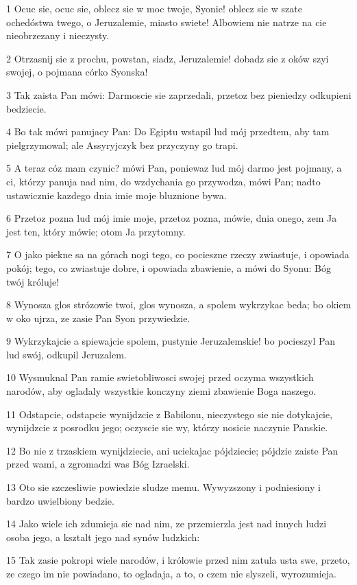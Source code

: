 \par 1 Ocuc sie, ocuc sie, oblecz sie w moc twoje, Syonie! oblecz sie w szate ochedóstwa twego, o Jeruzalemie, miasto swiete! Albowiem nie natrze na cie nieobrzezany i nieczysty.
\par 2 Otrzasnij sie z prochu, powstan, siadz, Jeruzalemie! dobadz sie z oków szyi swojej, o pojmana córko Syonska!
\par 3 Tak zaista Pan mówi: Darmoscie sie zaprzedali, przetoz bez pieniedzy odkupieni bedziecie.
\par 4 Bo tak mówi panujacy Pan: Do Egiptu wstapil lud mój przedtem, aby tam pielgrzymowal; ale Assyryjczyk bez przyczyny go trapi.
\par 5 A teraz cóz mam czynic? mówi Pan, poniewaz lud mój darmo jest pojmany, a ci, którzy panuja nad nim, do wzdychania go przywodza, mówi Pan; nadto ustawicznie kazdego dnia imie moje bluznione bywa.
\par 6 Przetoz pozna lud mój imie moje, przetoz pozna, mówie, dnia onego, zem Ja jest ten, który mówie; otom Ja przytomny.
\par 7 O jako piekne sa na górach nogi tego, co pocieszne rzeczy zwiastuje, i opowiada pokój; tego, co zwiastuje dobre, i opowiada zbawienie, a mówi do Syonu: Bóg twój króluje!
\par 8 Wynosza glos strózowie twoi, glos wynosza, a spolem wykrzykac beda; bo okiem w oko ujrza, ze zasie Pan Syon przywiedzie.
\par 9 Wykrzykajcie a spiewajcie spolem, pustynie Jeruzalemskie! bo pocieszyl Pan lud swój, odkupil Jeruzalem.
\par 10 Wysmuknal Pan ramie swietobliwosci swojej przed oczyma wszystkich narodów, aby ogladaly wszystkie konczyny ziemi zbawienie Boga naszego.
\par 11 Odstapcie, odstapcie wynijdzcie z Babilonu, nieczystego sie nie dotykajcie, wynijdzcie z posrodku jego; oczyscie sie wy, którzy nosicie naczynie Panskie.
\par 12 Bo nie z trzaskiem wynijdziecie, ani uciekajac pójdziecie; pójdzie zaiste Pan przed wami, a zgromadzi was Bóg Izraelski.
\par 13 Oto sie szczesliwie powiedzie sludze memu. Wywyzszony i podniesiony i bardzo uwielbiony bedzie.
\par 14 Jako wiele ich zdumieja sie nad nim, ze przemierzla jest nad innych ludzi osoba jego, a ksztalt jego nad synów ludzkich:
\par 15 Tak zasie pokropi wiele narodów, i królowie przed nim zatula usta swe, przeto, ze czego im nie powiadano, to ogladaja, a to, o czem nie slyszeli, wyrozumieja.

